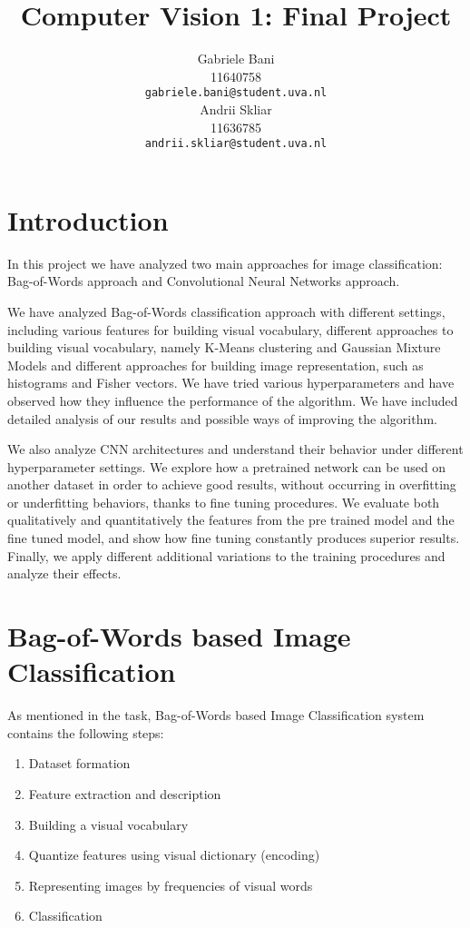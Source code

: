 \documentclass{article}
\title{Computer Vision 1: Final Project}
\author{
	Gabriele Bani \\
	11640758 \\
  \texttt{gabriele.bani@student.uva.nl} \\
  \And
  	Andrii Skliar \\
  11636785 \\
  \texttt{andrii.skliar@student.uva.nl} \\
}
\begin{document}
\maketitle

\section{Introduction}
In this project we have analyzed two main approaches for image classification: Bag-of-Words approach and Convolutional Neural Networks approach.

We have analyzed Bag-of-Words classification approach with different settings, including various features for building visual vocabulary, different approaches to building visual vocabulary, namely K-Means clustering and Gaussian Mixture Models and different approaches for building image representation, such as histograms and Fisher vectors. We have tried various hyperparameters and have observed how they influence the performance of the algorithm. We have included detailed analysis of our results and possible ways of improving the algorithm.

We also analyze CNN architectures and understand their behavior under different hyperparameter settings. We explore how a pretrained network can be used on another dataset in order to achieve good results, without occurring in overfitting or underfitting behaviors, thanks to fine tuning procedures. We evaluate both qualitatively and quantitatively the features from the pre trained model and the fine tuned model, and show how fine tuning constantly produces superior results. Finally, we apply different additional variations to the training procedures and analyze their effects.  

\section{Bag-of-Words based Image Classiﬁcation}
As mentioned in the task, Bag-of-Words based Image Classiﬁcation system contains the following steps:

\begin{enumerate}
    \item Dataset formation
    \item Feature extraction and description
    \item Building a visual vocabulary
    \item Quantize features using visual dictionary (encoding)
    \item Representing images by frequencies of visual words
    \item Classiﬁcation
\end{enumerate}
\end{document}
